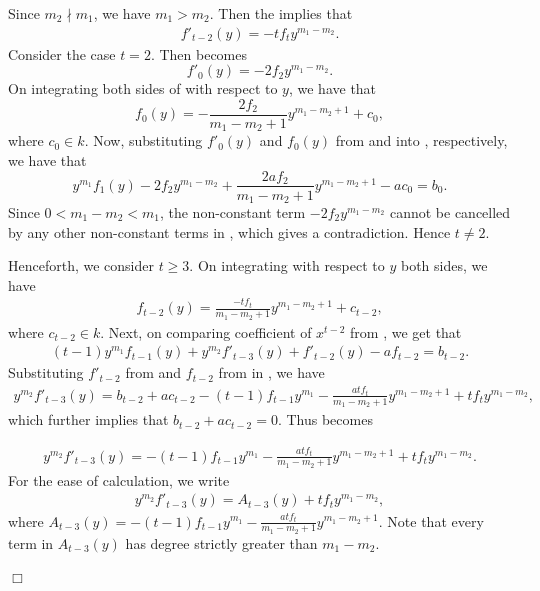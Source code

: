 \documentclass[12pt,reqno]{amsart}
\renewcommand{\geq}{\geqslant}
\numberwithin{thm}{section}
\theoremstyle{definition}
\numberwithin{equation}{thm}
\renewenvironment{proof}{\par\noindent {\em Proof:}}{\hfill$\Box$\medskip}
\theoremstyle{plain}
\begin{document}
\begin{proof}
	Since $m_2 \nmid m_1$, we have $m_1>m_2$. Then the  implies that
	\begin{align}\label{Eqn1'}
		f'_{t-2}(y)=-tf_ty^{m_1-m_2}.
	\end{align}
    Consider the case $t=2.$ Then  becomes 
    \begin{equation}\label{eqn t=2}
       f'_{0}(y)=-2f_2y^{m_1-m_2}. 
    \end{equation} On integrating both sides of  with respect to $y$, we have that
    \begin{equation}\label{eqn' t=2}
        f_0(y)=-\frac{2f_2}{m_1-m_2+1}y^{m_1-m_2+1}+c_0,
    \end{equation} where $c_0\in k.$ Now, substituting $f'_0(y)$ and $f_0(y)$ from  and  into , respectively, we have that
    \begin{equation}\label{eqn'' t=2}
y^{m_1}f_1(y)-2f_2y^{m_1-m_2}+\frac{2af_2}{m_1-m_2+1}y^{m_1-m_2+1}-ac_0=b_0.
    \end{equation} Since $0<m_1-m_2<m_1$, the non-constant term $-2f_2y^{m_1-m_2}$ cannot be cancelled by any other non-constant terms in , which gives a contradiction. Hence $t\neq 2.$

    Henceforth, we consider $t\geq 3.$ On integrating  with respect to $y$ both sides, we have 
	\begin{align}\label{Eqn1''}
		f_{t-2}(y)=\frac{-tf_t}{m_1-m_2+1}y^{m_1-m_2+1}+c_{t-2},
	\end{align} where $c_{t-2}\in k$.
	Next, on comparing coefficient of $x^{t-2}$ from , we get that
	\begin{align}\label{eqn(t-2)}
		(t-1)y^{m_1}f_{t-1}(y)+y^{m_2}f'_{t-3}(y)+f'_{t-2}(y)-af_{t-2}=b_{t-2}.
	\end{align} Substituting $f'_{t-2}$ from  and $f_{t-2}$ from  in , we have
	\begin{align*}
		y^{m_2}f'_{t-3}(y)=b_{t-2}+ac_{t-2}-(t-1)f_{t-1}y^{m_1}-\frac{atf_t}{m_1-m_2+1}y^{m_1-m_2+1}+tf_ty^{m_1-m_2},
	\end{align*}which further implies that $b_{t-2}+ac_{t-2}=0$. Thus  becomes
	
	\begin{align}\label{Eqn2'}
		y^{m_2}f'_{t-3}(y)=-(t-1)f_{t-1}y^{m_1}-\frac{atf_t}{m_1-m_2+1}y^{m_1-m_2+1}+tf_ty^{m_1-m_2}.
	\end{align}
	For the ease of calculation, we write 
	\begin{align}\label{Eqn2''}
		y^{m_2}f'_{t-3}(y)=A_{t-3}(y)+tf_ty^{m_1-m_2},
	\end{align} where $A_{t-3}(y)=-(t-1)f_{t-1}y^{m_1}-\frac{atf_t}{m_1-m_2+1}y^{m_1-m_2+1}$. Note that every term in $A_{t-3}(y)$ has degree strictly greater than $m_1-m_2$.
	

\end{proof}
\end{document}
